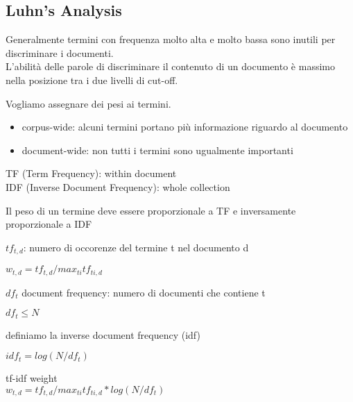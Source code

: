 \subsection*{Luhn's Analysis}
Generalmente termini con frequenza molto alta e molto bassa sono inutili per discriminare i documenti.
\\


L'abilità delle parole di discriminare il contenuto di un documento è massimo nella posizione tra i due livelli di cut-off.

Vogliamo assegnare dei pesi ai termini.
\begin{itemize}
  \item corpus-wide: alcuni termini portano più informazione riguardo al documento
  \item document-wide: non tutti i termini sono ugualmente importanti  
\end{itemize}

TF (Term Frequency): within document\\
IDF (Inverse Document Frequency): whole collection

Il peso di un termine deve essere proporzionale a TF e inversamente proporzionale a IDF

$tf_{t,d}$: numero di occorenze del termine t nel documento d

$w_{t, d} = tf_{t,d} / max_{ti} tf_{ti,d}$

$df_t$ document frequency: numero di documenti che contiene t

$df_t \leq N$

definiamo la inverse document frequency (idf)

$idf_t = log(N/df_t)$

tf-idf weight\\
$w_{t, d} = tf_{t,d} / max_{ti} tf_{ti,d} * log(N/df_t)$
